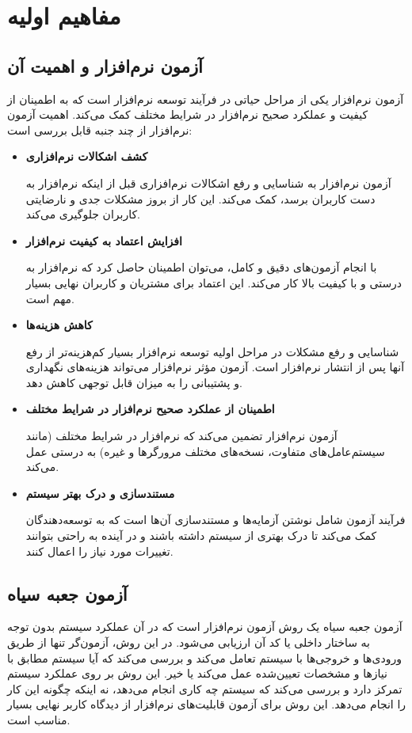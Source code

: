 \chapter{مفاهیم اولیه}
\label{chapter2}

\section{آزمون نرم‌افزار و اهمیت آن}

آزمون نرم‌افزار یکی از مراحل حیاتی در فرآیند توسعه نرم‌افزار است که به اطمینان از کیفیت و عملکرد صحیح نرم‌افزار در شرایط مختلف کمک می‌کند. اهمیت آزمون نرم‌افزار از چند جنبه قابل بررسی است:

\begin{itemize}
	\item \textbf{کشف اشکالات نرم‌افزاری}
	
	آزمون نرم‌افزار به شناسایی و رفع اشکالات نرم‌افزاری قبل از اینکه نرم‌افزار به دست کاربران برسد، کمک می‌کند. این کار از بروز مشکلات جدی و نارضایتی کاربران جلوگیری می‌کند.
	\item \textbf{افزایش اعتماد به کیفیت نرم‌افزار}
	
	با انجام آزمون‌های دقیق و کامل، می‌توان اطمینان حاصل کرد که نرم‌افزار به درستی و با کیفیت بالا کار می‌کند. این اعتماد برای مشتریان و کاربران نهایی بسیار مهم است.
	\item \textbf{کاهش هزینه‌ها}
	
	شناسایی و رفع مشکلات در مراحل اولیه توسعه نرم‌افزار بسیار کم‌هزینه‌تر از رفع آنها پس از انتشار نرم‌افزار است. آزمون مؤثر نرم‌افزار می‌تواند هزینه‌های نگهداری و پشتیبانی را به میزان قابل توجهی کاهش دهد.
	\item \textbf{اطمینان از عملکرد صحیح نرم‌افزار در شرایط مختلف}
	
	آزمون نرم‌افزار تضمین می‌کند که نرم‌افزار در شرایط مختلف (مانند سیستم‌عامل‌های متفاوت، نسخه‌های مختلف مرورگرها و غیره) به درستی عمل می‌کند.
	\item \textbf{مستندسازی و درک بهتر سیستم}
	
	فرآیند آزمون شامل نوشتن آزمایه‌ها و مستندسازی آن‌ها است که به توسعه‌دهندگان کمک می‌کند تا درک بهتری از سیستم داشته باشند و در آینده به راحتی بتوانند تغییرات مورد نیاز را اعمال کنند.
\end{itemize}

\section{آزمون جعبه ‌سیاه}

آزمون جعبه سیاه
\cite{nidhra2012black}
 یک روش آزمون نرم‌افزار است که در آن عملکرد سیستم بدون توجه به ساختار داخلی یا کد آن ارزیابی می‌شود. در این روش، آزمون‌گر تنها از طریق ورودی‌ها و خروجی‌ها با سیستم تعامل می‌کند و بررسی می‌کند که آیا سیستم مطابق با نیازها و مشخصات تعیین‌شده عمل می‌کند یا خیر. این روش بر روی عملکرد سیستم تمرکز دارد و بررسی می‌کند که سیستم چه کاری انجام می‌دهد، نه اینکه چگونه این کار را انجام می‌دهد. این روش برای آزمون قابلیت‌های نرم‌افزار از دیدگاه کاربر نهایی بسیار مناسب است.


